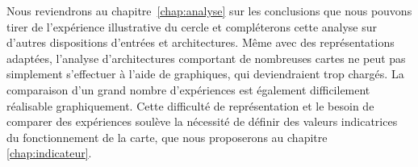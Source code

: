 \documentclass[../main]{subfiles}
\begin{document}
Nous reviendrons au chapitre~\ref{chap:analyse} sur les conclusions que nous pouvons tirer de l'expérience illustrative du cercle et compléterons cette analyse sur d'autres dispositions d'entrées et architectures.
Même avec des représentations adaptées, l'analyse d'architectures comportant de nombreuses cartes ne peut pas simplement s'effectuer à l'aide de graphiques, qui deviendraient trop chargés. 
La comparaison d'un grand nombre d'expériences est également difficilement réalisable graphiquement.
Cette difficulté de représentation et le besoin de comparer des expériences soulève la nécessité de définir des valeurs indicatrices du fonctionnement de la carte, que nous proposerons au chapitre \ref{chap:indicateur}.
 
\ifSubfilesClassLoaded{
    \printbibliography
}{}
\end{document}
